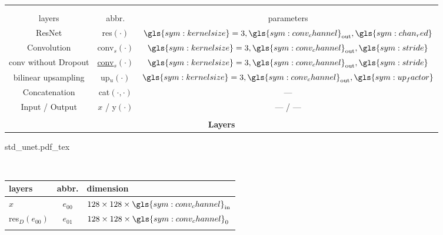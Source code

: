 \begin{center}
	\begin{minipage}{0.5\textwidth}
		\centering
		\begin{tabular}{c|c|c}
			\multicolumn{3}{c}{}             \\			
			\multicolumn{3}{c}{}             \\				
			layers & abbr. & parameters \\
			\hline
			\textcolor[rgb]{0.2,0.4,0.8}{ResNet} & res$(\cdot)$ & $\gls{sym:kernelsize}=3, \gls{sym:conv_channel}_{\text{out}}, \gls{sym:chan_red}$ \\
			\textcolor[rgb]{0.18,0.76,0.49}{Convolution} & \gls{conv}$_s(\cdot)$ & $\gls{sym:kernelsize}=3, \gls{sym:conv_channel}_{\text{out}}, \gls{sym:stride}$\\
			\textcolor[rgb]{0.18,0.76,0.49}{\gls{conv} without Dropout} & \underline{\gls{conv}}$_s(\cdot)$ & $\gls{sym:kernelsize}=3, \gls{sym:conv_channel}_{\text{out}}, \gls{sym:stride}$\\		
			\textcolor[rgb]{0.57,0.25,0.67}{bilinear upsampling} & up$_u(\cdot)$ & $\gls{sym:kernelsize}=3 ,\gls{sym:conv_channel}_{\text{out}}, \gls{sym:up_factor}$\\
			Concatenation & cat$(\cdot ,\cdot)$ & ---\\
			Input / \textcolor[rgb]{1.0,0.4,0.0}{Output} & $x$ / y$(\cdot)$& --- / ---\\
			\multicolumn{3}{c}{}             \\					
			\multicolumn{3}{c}{\textbf{Layers}}             \\
		\end{tabular}
	\end{minipage}
	\hfill
	\begin{minipage}{0.47\textwidth}
		\begin{center}
			{std_unet.pdf_tex}
		\end{center}
	\end{minipage}\\
	\begin{minipage}{0.4\textwidth}
		\centering
		\begin{tabular}{l|c|l}
			layers & abbr. & dimension\\
			\hline
			$x$ & $e_{00}$ & $128 \times 128 \times \gls{sym:conv_channel}_\text{in}$\\	
			res$_D(e_{00})$ & $e_{01}$ & $128 \times 128 \times \gls{sym:conv_channel}_0$\\
			&&                                                       \\

\end{tabular}
\end{minipage}
\end{center}
